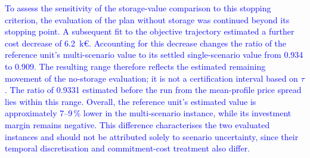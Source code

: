 \documentclass[preprint,12pt]{elsarticle}
\begin{document}
\textcolor{blue}{
    To assess the sensitivity of the storage-value comparison to this stopping criterion, the evaluation of the plan without storage was continued beyond its stopping point. A subsequent fit to the objective trajectory estimated a further cost decrease of 6.2~k\euro{}. Accounting for this decrease changes the ratio of the reference unit's multi-scenario value to its settled single-scenario value from 0.934 to 0.909. The resulting range therefore reflects the estimated remaining movement of the no-storage evaluation; it is not a certification interval based on $\tau$. The ratio of 0.9331 estimated before the run from the mean-profile price spread lies within this range. Overall, the reference unit's estimated value is approximately 7--9\,\% lower in the multi-scenario instance, while its investment margin remains negative.
    This difference characterises the two evaluated instances and should not be attributed solely to scenario uncertainty, since their temporal discretisation and commitment-cost treatment also differ.
}
\end{document}
